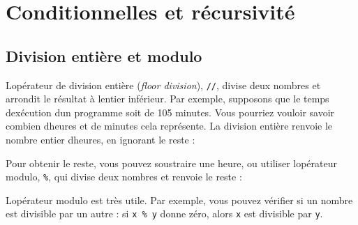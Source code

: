 \hypertarget{conditionnelles-et-ruxe9cursivituxe9}{%
\section{Conditionnelles et
récursivité}\label{conditionnelles-et-ruxe9cursivituxe9}}

\hypertarget{division-entiuxe8re-et-modulo}{%
\subsection{Division entière et
modulo}\label{division-entiuxe8re-et-modulo}}

L\textquotesingle opérateur de division entière (\emph{floor division}),
\texttt{//}, divise deux nombres et arrondit le résultat à
l\textquotesingle entier inférieur. Par exemple, supposons que le temps
d\textquotesingle exécution d\textquotesingle un programme soit de 105
minutes. Vous pourriez vouloir savoir combien d\textquotesingle heures
et de minutes cela représente. La division entière renvoie le nombre
entier d\textquotesingle heures, en ignorant le reste :

\begin{Shaded}
\begin{Highlighting}[]
\OperatorTok{\textgreater{}\textgreater{}\textgreater{}}\OperatorTok{=} 
\OperatorTok{\textgreater{}\textgreater{}\textgreater{}}\OperatorTok{//} 
\end{Highlighting}
\end{Shaded}

Pour obtenir le reste, vous pouvez soustraire une heure, ou utiliser
l\textquotesingle opérateur modulo, \texttt{\%}, qui divise deux nombres
et renvoie le reste :

\begin{Shaded}
\begin{Highlighting}[]
\OperatorTok{\textgreater{}\textgreater{}\textgreater{}}\OperatorTok{=}\OperatorTok{\%} 
\OperatorTok{\textgreater{}\textgreater{}\textgreater{}}
\end{Highlighting}
\end{Shaded}

L\textquotesingle opérateur modulo est très utile. Par exemple, vous
pouvez vérifier si un nombre est divisible par un autre : si
\texttt{x\ \%\ y} donne zéro, alors \texttt{x} est divisible par
\texttt{y}.

